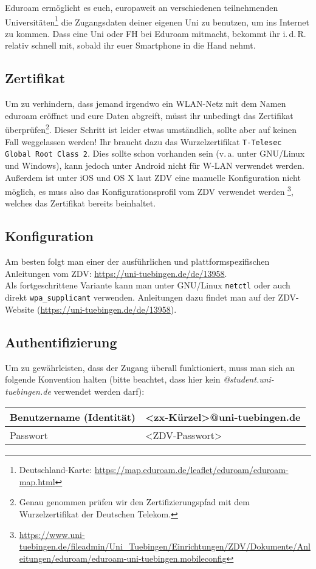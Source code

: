 Eduroam ermöglicht es euch, europaweit an verschiedenen teilnehmenden
Universitäten\footnote{Deutschland-Karte:
\url{https://map.eduroam.de/leaflet/eduroam/eduroam-map.html}} die Zugangsdaten
deiner eigenen Uni zu benutzen, um ins Internet zu kommen. Dass eine Uni oder
FH bei Eduroam mitmacht, bekommt ihr i.\,d.\,R. relativ schnell mit, sobald ihr
euer Smartphone in die Hand nehmt.

\subsection*{Zertifikat}
  Um zu verhindern, dass jemand irgendwo ein WLAN-Netz mit dem Namen eduroam
  eröffnet und eure Daten abgreift, müsst ihr unbedingt das Zertifikat
  überprüfen\footnote{Genau genommen prüfen wir den Zertifizierungspfad mit dem
  Wurzelzertifikat der Deutschen Telekom.}. Dieser Schritt ist leider etwas
  umständlich, sollte aber auf keinen Fall weggelassen werden! Ihr braucht dazu das Wurzelzertifikat \glqq\texttt{T-Telesec Global Root Class 2}\grqq. Dies
  sollte schon vorhanden sein (v.\,a. unter GNU/Linux und Windows), kann
  jedoch unter Android nicht für W-LAN verwendet werden. Außerdem ist unter iOS
  und OS X laut ZDV eine manuelle Konfiguration nicht möglich, es muss also das
  Konfigurationsprofil vom ZDV verwendet werden
  \footnote{\url{https://www.uni-tuebingen.de/fileadmin/Uni_Tuebingen/Einrichtungen/ZDV/Dokumente/Anleitungen/eduroam/eduroam-uni-tuebingen.mobileconfig}},
  welches das Zertifikat bereits beinhaltet.

\subsection*{Konfiguration}
  Am besten folgt man einer der ausführlichen und plattformspezifischen
  Anleitungen vom ZDV:
  \url{https://uni-tuebingen.de/de/13958}.\\
  Als fortgeschrittene Variante kann man unter GNU/Linux \texttt{netctl} oder auch
  direkt \texttt{wpa\_supplicant} verwenden. Anleitungen dazu findet man auf der
  ZDV-Website (\url{https://uni-tuebingen.de/de/13958}).

\subsection*{Authentifizierung}
  Um zu gewährleisten, dass der Zugang überall funktioniert, muss man sich an
  folgende Konvention halten (bitte beachtet, dass hier kein
  \emph{@student.uni-tuebingen.de} verwendet werden darf): \medskip \\
  \begin{tabular}{l|l}
    Benutzername (Identität) & <zx-Kürzel>@uni-tuebingen.de \\ \hline
    Passwort                 & <ZDV-Passwort>
  \end{tabular}

\vfill
